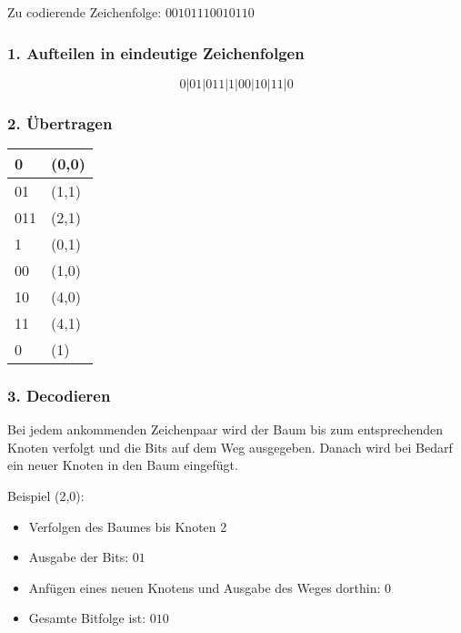 Zu codierende Zeichenfolge: $00101110010110$

\subsubsection*{1. Aufteilen in eindeutige Zeichenfolgen}

\[
	0|01|011|1|00|10|11|0
\]

\subsubsection*{2. Übertragen}

\begin{minipage}{.4\linewidth}
	\begin{tabular}[H]{|l|l|}
		\hline
		0 & (0,0) \\
		\hline
		01 & (1,1) \\
		\hline
		011 & (2,1) \\
		\hline
		1 & (0,1) \\
		\hline
		00 & (1,0) \\
		\hline
		10 & (4,0) \\
		\hline
		11 & (4,1) \\
		\hline
		0 & (1) \\
		\hline
	\end{tabular}
\end{minipage}
\begin{minipage}{.6\linewidth}
	
\end{minipage}

\subsubsection*{3. Decodieren}

Bei jedem ankommenden Zeichenpaar wird der Baum bis zum entsprechenden Knoten
verfolgt und die Bits auf dem Weg ausgegeben. Danach wird bei Bedarf ein neuer
Knoten in den Baum eingefügt.

Beispiel (2,0):
\begin{itemize}
	\item Verfolgen des Baumes bis Knoten 2
	\item Ausgabe der Bits: $01$
	\item Anfügen eines neuen Knotens und Ausgabe des Weges dorthin: $0$
	\item Gesamte Bitfolge ist: $010$
\end{itemize}
